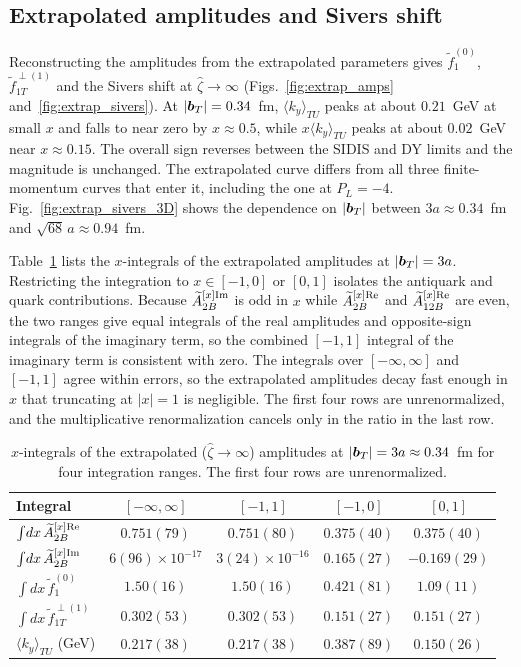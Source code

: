 \subsection{Extrapolated amplitudes and Sivers shift}
\label{sec:extrapolated_sivers}

Reconstructing the amplitudes from the extrapolated parameters gives $\tilde f_1^{(0)}$, $\tilde f_{1T}^{\perp(1)}$ and the Sivers shift at $\hat\zeta\to\infty$ (Figs.~\ref{fig:extrap_amps} and~\ref{fig:extrap_sivers}). At $|\boldsymbol{b}_T|=0.34$~fm, $\langle k_y\rangle_{TU}$ peaks at about $0.21$~GeV at small $x$ and falls to near zero by $x\approx0.5$, while $x\langle k_y\rangle_{TU}$ peaks at about $0.02$~GeV near $x\approx0.15$. The overall sign reverses between the SIDIS and DY limits and the magnitude is unchanged. The extrapolated curve differs from all three finite-momentum curves that enter it, including the one at $P_L=-4$. Fig.~\ref{fig:extrap_sivers_3D} shows the dependence on $|\boldsymbol{b}_T|$ between $3a\approx0.34$~fm and $\sqrt{68}\,a\approx0.94$~fm.

Table~\ref{tab:integrals} lists the $x$-integrals of the extrapolated amplitudes at $|\boldsymbol{b}_T|=3a$. Restricting the integration to $x\in[-1,0]$ or $[0,1]$ isolates the antiquark and quark contributions. Because $\widetilde{A}^{[x]\text{Im}}_{2B}$ is odd in $x$ while $\widetilde{A}^{[x]\text{Re}}_{2B}$ and $\widetilde{A}^{[x]\text{Re}}_{12B}$ are even, the two ranges give equal integrals of the real amplitudes and opposite-sign integrals of the imaginary term, so the combined $[-1,1]$ integral of the imaginary term is consistent with zero. The integrals over $[-\infty,\infty]$ and $[-1,1]$ agree within errors, so the extrapolated amplitudes decay fast enough in $x$ that truncating at $|x|=1$ is negligible. The first four rows are unrenormalized, and the multiplicative renormalization cancels only in the ratio in the last row.

\begin{table}
\caption{$x$-integrals of the extrapolated ($\hat\zeta\to\infty$) amplitudes at $|\boldsymbol{b}_T|=3a\approx0.34$~fm for four integration ranges. The first four rows are unrenormalized.}
\label{tab:integrals}
\begin{ruledtabular}
\begin{tabular}{lcccc}
Integral & $[-\infty,\infty]$ & $[-1,1]$ & $[-1,0]$ & $[0,1]$ \\
\hline
$\int\!dx\,\widetilde{A}^{[x]\text{Re}}_{2B}$ & $0.751(79)$ & $0.751(80)$ & $0.375(40)$ & $0.375(40)$ \\
$\int\!dx\,\widetilde{A}^{[x]\text{Im}}_{2B}$ & $6(96)\!\times\!10^{-17}$ & $3(24)\!\times\!10^{-16}$ & $0.165(27)$ & $-0.169(29)$ \\
$\int\!dx\,\tilde f_1^{(0)}$ & $1.50(16)$ & $1.50(16)$ & $0.421(81)$ & $1.09(11)$ \\
$\int\!dx\,\tilde f_{1T}^{\perp(1)}$ & $0.302(53)$ & $0.302(53)$ & $0.151(27)$ & $0.151(27)$ \\
$\langle k_y\rangle_{TU}$ (GeV) & $0.217(38)$ & $0.217(38)$ & $0.387(89)$ & $0.150(26)$ \\
\end{tabular}
\end{ruledtabular}
\end{table}

